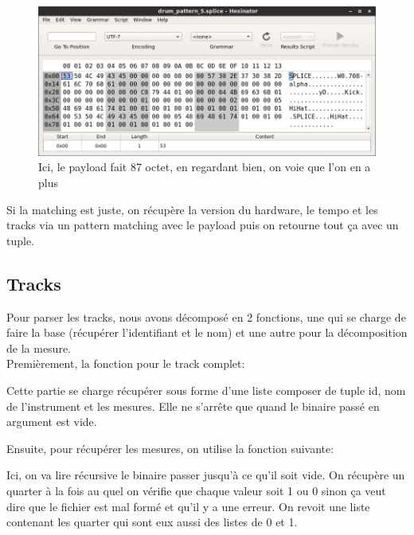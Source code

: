 \documentclass[10pt,a4paper]{article}
\begin{document}
\begin{figure}[htc]
	\includegraphics[scale=0.51]{images/hexa_fail.png}
	\caption{Ici, le payload fait 87 octet, en regardant bien, on voie que l'on en a plus}
\end{figure}

Si la matching est juste, on récupère la version du hardware, le tempo et les tracks via un pattern matching avec le payload puis on retourne tout ça avec un tuple.

\subsection{Tracks}
Pour parser les tracks, nous avons décomposé en 2 fonctions, une qui se charge de faire la base (récupérer l'identifiant et le nom) et une autre pour la décomposition de la mesure.\\

Premièrement, la fonction pour le track complet:



\newpage

Cette partie se charge récupérer sous forme d'une liste composer de tuple id, nom de l'instrument et les mesures. Elle ne s'arrête que quand le binaire passé en argument est vide.

Ensuite, pour récupérer les mesures, on utilise la fonction suivante:



Ici, on va lire récursive le binaire passer jusqu'à ce qu'il soit vide. On récupère un quarter à la fois au quel on vérifie que chaque valeur soit 1 ou 0 sinon ça veut dire que le fichier est mal formé et qu'il y a une erreur. On revoit une liste contenant les quarter qui sont eux aussi des listes de 0 et 1.
\end{document}
